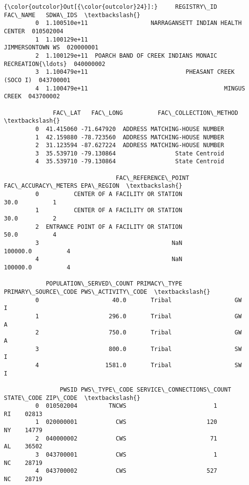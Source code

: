 \documentclass[11pt]{article}
\begin{document}
\begin{Verbatim}[commandchars=\\\{\}]
{\color{outcolor}Out[{\color{outcolor}24}]:}     REGISTRY\_ID                                           FAC\_NAME   SDWA\_IDS  \textbackslash{}
         0  1.100510e+11                  NARRAGANSETT INDIAN HEALTH CENTER  010502004   
         1  1.100129e+11                                   JIMMERSONTOWN WS  020000001   
         2  1.100129e+11  POARCH BAND OF CREEK INDIANS MONAIC RECREATION{\ldots}  040000002   
         3  1.100479e+11                            PHEASANT CREEK (SOCO I)  043700001   
         4  1.100479e+11                                       MINGUS CREEK  043700002   
         
              FAC\_LAT   FAC\_LONG          FAC\_COLLECTION\_METHOD  \textbackslash{}
         0  41.415060 -71.647920  ADDRESS MATCHING-HOUSE NUMBER   
         1  42.159880 -78.723560  ADDRESS MATCHING-HOUSE NUMBER   
         2  31.123594 -87.627224  ADDRESS MATCHING-HOUSE NUMBER   
         3  35.539710 -79.130864                 State Centroid   
         4  35.539710 -79.130864                 State Centroid   
         
                                FAC\_REFERENCE\_POINT  FAC\_ACCURACY\_METERS EPA\_REGION  \textbackslash{}
         0          CENTER OF A FACILITY OR STATION                 30.0          1   
         1          CENTER OF A FACILITY OR STATION                 30.0          2   
         2  ENTRANCE POINT OF A FACILITY OR STATION                 50.0          4   
         3                                      NaN             100000.0          4   
         4                                      NaN             100000.0          4   
         
            POPULATION\_SERVED\_COUNT PRIMACY\_TYPE PRIMARY\_SOURCE\_CODE PWS\_ACTIVITY\_CODE  \textbackslash{}
         0                     40.0       Tribal                  GW                 I   
         1                    296.0       Tribal                  GW                 A   
         2                    750.0       Tribal                  GW                 A   
         3                    800.0       Tribal                  SW                 I   
         4                   1581.0       Tribal                  SW                 I   
         
                PWSID PWS\_TYPE\_CODE SERVICE\_CONNECTIONS\_COUNT STATE\_CODE ZIP\_CODE  \textbackslash{}
         0  010502004         TNCWS                         1         RI    02813   
         1  020000001           CWS                       120         NY    14779   
         2  040000002           CWS                        71         AL    36502   
         3  043700001           CWS                         1         NC    28719   
         4  043700002           CWS                       527         NC    28719   
         

\end{Verbatim}
\end{document}
